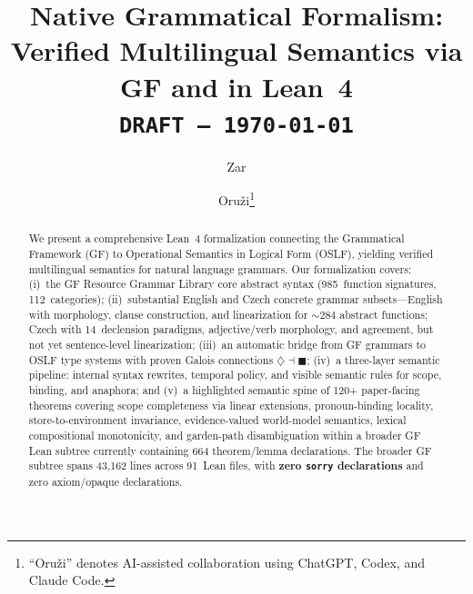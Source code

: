 \documentclass[11pt]{article}
\title{Native Grammatical Formalism:\\
  Verified Multilingual Semantics via GF and \OSLF{} in Lean~4\\[4pt]
  \large\texttt{DRAFT --- \today}}
\author{Zar \and Oru\v{z}i\footnote{``Oru\v{z}i'' denotes AI-assisted collaboration using ChatGPT, Codex, and Claude Code.}}
\newcommand{\code}[1]{\texttt{#1}}
\newcommand{\Dia}{\ensuremath{\diamondsuit}}
\newcommand{\Bx}{\ensuremath{\blacksquare}}
\newcommand{\OSLF}{\textup{OSLF}}
\newcommand{\GF}{\textup{GF}}
\begin{document}
\maketitle

\begin{abstract}
We present a comprehensive Lean~4 formalization connecting the Grammatical
Framework (\GF{}) to Operational Semantics in Logical Form (\OSLF{}), yielding
verified multilingual semantics for natural language grammars.  Our
formalization covers: (i)~the \GF{} Resource Grammar Library core abstract
syntax (985~function signatures, 112~categories); (ii)~substantial English and Czech concrete
grammar subsets---English with morphology, clause construction, and linearization
for ${\sim}284$ abstract functions; Czech with 14~declension paradigms,
adjective/verb morphology, and agreement, but not yet sentence-level linearization; (iii)~an automatic bridge
from \GF{} grammars to \OSLF{} type systems with proven Galois connections
$\Dia \dashv \Bx$; (iv)~a three-layer semantic pipeline: internal syntax
rewrites, temporal policy, and visible semantic rules for scope,
binding, and anaphora; and (v)~a highlighted semantic spine of
120+ paper-facing theorems covering scope completeness via linear
extensions, pronoun-binding locality, store-to-environment invariance,
evidence-valued world-model semantics, lexical compositional monotonicity,
and garden-path disambiguation within a
broader \GF{} Lean subtree currently containing 664 theorem/lemma declarations.
The broader \GF{} subtree spans 43,162 lines across 91~Lean files, with
\textbf{zero \code{sorry} declarations} and zero axiom/opaque declarations.
\end{abstract}
\end{document}
